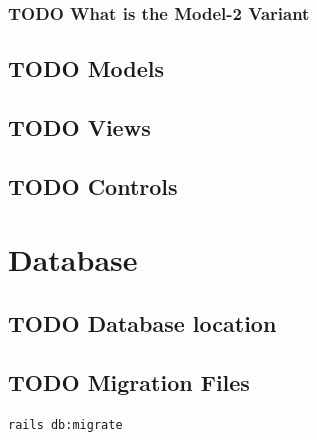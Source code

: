 \documentclass[a4paper]{article}
\begin{document}
\subsubsection{{\bfseries\sffamily TODO} What is the Model-2 Variant}
\label{sec-3-1-2}
\subsection{{\bfseries\sffamily TODO} Models}
\label{sec-3-2}
\subsection{{\bfseries\sffamily TODO} Views}
\label{sec-3-3}
\subsection{{\bfseries\sffamily TODO} Controls}
\label{sec-3-4}


\section{Database}
\label{sec-4}

\subsection{{\bfseries\sffamily TODO} Database location}
\label{sec-4-1}

\subsection{{\bfseries\sffamily TODO} Migration Files}
\label{sec-4-2}
\begin{verbatim}
rails db:migrate
\end{verbatim}
\end{document}
